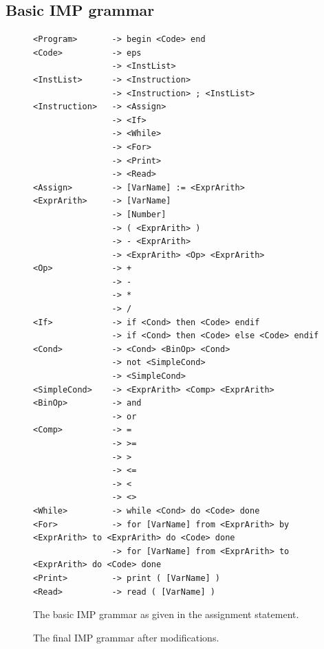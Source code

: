 \documentclass[a4paper,11pt]{article}
\begin{document}
  \subsection{Basic IMP grammar}
    \begin{figure}[h!]
      \centering
      \begin{lstlisting}
<Program>       -> begin <Code> end
<Code>          -> eps
                -> <InstList>
<InstList>      -> <Instruction>
                -> <Instruction> ; <InstList>
<Instruction>   -> <Assign>
                -> <If>
                -> <While>
                -> <For>
                -> <Print>
                -> <Read>
<Assign>        -> [VarName] := <ExprArith>
<ExprArith>     -> [VarName]
                -> [Number]
                -> ( <ExprArith> )
                -> - <ExprArith>
                -> <ExprArith> <Op> <ExprArith>
<Op>            -> +
                -> -
                -> *
                -> /
<If>            -> if <Cond> then <Code> endif
                -> if <Cond> then <Code> else <Code> endif
<Cond>          -> <Cond> <BinOp> <Cond>
                -> not <SimpleCond>
                -> <SimpleCond>
<SimpleCond>    -> <ExprArith> <Comp> <ExprArith>
<BinOp>         -> and
                -> or
<Comp>          -> = 
                -> >= 
                -> > 
                -> <= 
                -> < 
                -> <> 
<While>         -> while <Cond> do <Code> done
<For>           -> for [VarName] from <ExprArith> by <ExprArith> to <ExprArith> do <Code> done
                -> for [VarName] from <ExprArith> to <ExprArith> do <Code> done
<Print>         -> print ( [VarName] )
<Read>          -> read ( [VarName] )
      \end{lstlisting}
      \caption{The basic IMP grammar as given in the assignment statement.}
      \label{fig:basicimpgrammar}
    \end{figure}
  
    \begin{figure}[h!]
      \centering
      
      \caption{The final IMP grammar after modifications.}
      \label{fig:finalimpgrammar}
    \end{figure}
  
\end{document}
